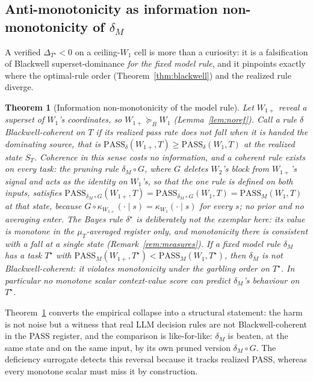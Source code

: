 \documentclass[11pt]{article}
\theoremstyle{plain}
\newtheorem{theorem}{Theorem}
\theoremstyle{definition}
\theoremstyle{remark}
\newcommand{\PASS}{\mathrm{PASS}}
\newcommand{\Bord}{\succeq_{B}}
\begin{document}
\subsection{Anti-monotonicity as information non-monotonicity of \texorpdfstring{$\delta_M$}{the model rule}}
\label{subsec:antimono}

A verified $\Delta_{T^\star}<0$ on a ceiling-$W_1$ cell is more than a curiosity: it is a falsification
of Blackwell superset-dominance \emph{for the fixed model rule}, and it pinpoints exactly where the
optimal-rule order (Theorem~\ref{thm:blackwell}) and the realized rule diverge.

\begin{theorem}[Information non-monotonicity of the model rule]
\label{thm:antimono}
Let $W_{1+}$ reveal a superset of $W_1$'s coordinates, so $W_{1+}\Bord W_1$
(Lemma~\ref{lem:noref}). Call a rule $\delta$ \emph{Blackwell-coherent on $T$} if its realized
pass rate does not fall when it is handed the dominating source, that is
$\PASS_\delta(W_{1+},T)\ge\PASS_\delta(W_1,T)$ at the realized state $S_T$. Coherence in this
sense costs no information, and a coherent rule exists on every task: the pruning rule
$\delta_M\circ G$, where $G$ deletes $W_2$'s block from $W_{1+}$'s signal and acts as the identity
on $W_1$'s, so that the one rule is defined on both inputs, satisfies
$\PASS_{\delta_M\circ G}(W_{1+},T)=\PASS_{\delta_M\circ G}(W_1,T)=\PASS_M(W_1,T)$ at that state,
because $G\circ\kappa_{W_{1+}}(\cdot\mid s)=\kappa_{W_1}(\cdot\mid s)$ for every $s$; no prior and
no averaging enter. The Bayes rule $\delta^\star$ is deliberately \emph{not} the exemplar here:
its value is monotone in the $\mu_T$-averaged register only, and monotonicity there is consistent
with a fall at a single state (Remark~\ref{rem:measures}). If a fixed model rule
$\delta_M$ has a task $T^\star$ with $\PASS_M(W_{1+},T^\star) <
\PASS_M(W_1,T^\star)$, then $\delta_M$ is \emph{not} Blackwell-coherent: it violates
monotonicity under the garbling order on $T^\star$. In particular no monotone scalar
context-value score can predict $\delta_M$'s behaviour on $T^\star$.
\end{theorem}

Theorem~\ref{thm:antimono} converts the empirical collapse into a structural statement: the harm is
not noise but a witness that real LLM decision rules are not Blackwell-coherent in the PASS
register, and the comparison is like-for-like: $\delta_M$ is beaten, at the same state and on the
same input, by its own pruned version $\delta_M\circ G$. The deficiency
surrogate detects this reversal because it tracks realized PASS, whereas every monotone scalar must
miss it by construction.
\end{document}
